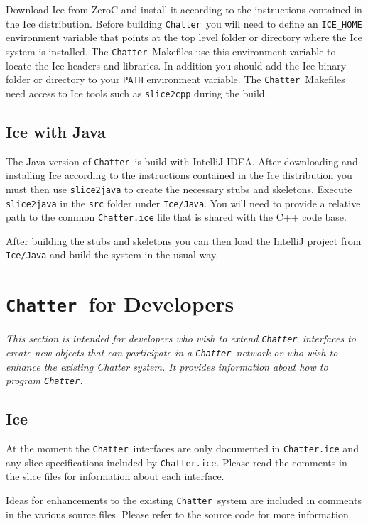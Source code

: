 \documentclass[twocolumn]{article}
\newcommand{\Chatter}{\texttt{Chatter}}
\begin{document}
Download Ice from ZeroC and install it according to the instructions contained in the Ice
distribution. Before building \Chatter\ you will need to define an \texttt{ICE\_HOME}
environment variable that points at the top level folder or directory where the Ice system is
installed. The \Chatter\ Makefiles use this environment variable to locate the Ice headers and
libraries. In addition you should add the Ice binary folder or directory to your \texttt{PATH}
environment variable. The \Chatter\ Makefiles need access to Ice tools such as
\texttt{slice2cpp} during the build.

\subsection{Ice with Java}

The Java version of \Chatter\ is build with IntelliJ IDEA. After downloading and installing Ice
according to the instructions contained in the Ice distribution you must then use
\texttt{slice2java} to create the necessary stubs and skeletons. Execute \texttt{slice2java} in
the \texttt{src} folder under \texttt{Ice/Java}. You will need to provide a relative path to the
common \texttt{Chatter.ice} file that is shared with the C++ code base.

After building the stubs and skeletons you can then load the IntelliJ project from
\texttt{Ice/Java} and build the system in the usual way.

\section{\Chatter\ for Developers}

\textit{This section is intended for developers who wish to extend \Chatter\ interfaces to
  create new objects that can participate in a \Chatter\ network or who wish to enhance the
  existing Chatter system. It provides information about how to program \Chatter.}

\subsection{Ice}

At the moment the \Chatter\ interfaces are only documented in \texttt{Chatter.ice} and any slice
specifications included by \texttt{Chatter.ice}. Please read the comments in the slice files for
information about each interface.

Ideas for enhancements to the existing \Chatter\ system are included in comments in the various
source files. Please refer to the source code for more information.
\end{document}
